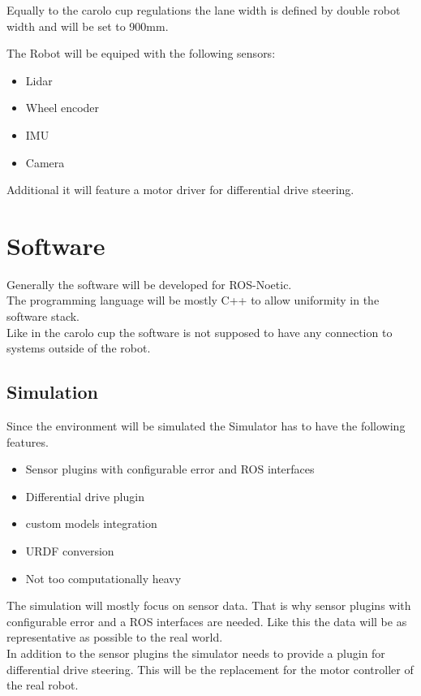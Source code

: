Equally to the carolo cup regulations the lane width is defined by double robot width and will be set to 900mm. 

The Robot will be equiped with the following sensors:

\begin{itemize}
	\item Lidar
	\item Wheel encoder
	\item IMU
	\item Camera
\end{itemize}

Additional it will feature a motor driver for differential drive steering.

\section{Software}
Generally the software will be developed for ROS-Noetic.\\
The programming language will be mostly C++ to allow uniformity in the software stack.\\
Like in the carolo cup the software is not supposed to have any connection to systems outside of the robot.\\

\subsection{Simulation}
Since the environment will be simulated the Simulator has to have the following features.
\begin{itemize}
	\item Sensor plugins with configurable error and ROS interfaces
	\item Differential drive plugin
	\item custom models integration
	\item URDF conversion
	\item Not too computationally heavy
\end{itemize}

The simulation will mostly focus on sensor data. That is why sensor plugins with configurable error and a ROS interfaces are needed. Like this the data will be as representative as possible to the real world.\\

In addition to the sensor plugins the simulator needs to provide a plugin for differential drive steering. This will be the replacement for the motor controller of the real robot.\\

